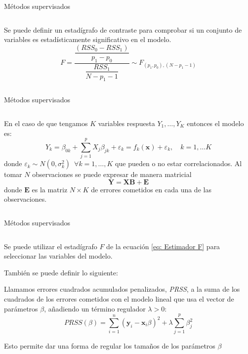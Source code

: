 \begin{frame}{Métodos supervisados}
\begin{columns}
\begin{column}{0.9\textwidth}
Se puede definir un estadígrafo de contraste para comprobar si un conjunto de variables es estadísticamente significativo en el modelo. 
\begin{equation}\label{eq: Estimador F}
F=\dfrac{\dfrac{(RSS_0-RSS_1)}{p_1-p_0}}{\dfrac{RSS_1}{N-p_1-1}}\sim F_{(p_1,p_0),(N-p_1-1)}
\end{equation}
\end{column}
\end{columns}
\end{frame}


\begin{frame}{Métodos supervisados}
\begin{columns}
\begin{column}{0.9\textwidth}
En el caso de que tengamos $K$ variables respuesta $Y_1,\ldots, Y_K$ entonces el modelo es:
\begin{equation}
Y_k=\beta_{0k}+\sum_{j=1}^p X_j\beta_{jk}+\varepsilon_k = f_k(\textbf{x})+\varepsilon_k, \quad k=1,\ldots K
\end{equation}
donde $\varepsilon_k \sim N(0,\sigma_k^2)\enspace\forall k=1,\ldots,K$ que pueden o no estar correlacionados. Al tomar $N$ observaciones se puede expresar de manera matricial
\begin{equation}
\mathbf{Y=XB+E}
\end{equation}
donde $\mathbf{E}$ es la matriz $N\times K$ de errores cometidos en cada una de las observaciones.
\end{column}
\end{columns}
\end{frame}


\begin{frame}{Métodos supervisados}
\begin{columns}
\begin{column}{0.9\textwidth}
Se puede utilizar el estadígrafo $F$ de la ecuación \ref{eq: Estimador F} para seleccionar las variables del modelo. 

También se puede definir lo siguiente: 
\begin{defi} 
Llamamos errores cuadrados acumulados penalizados, \emph{PRSS}, a la suma de los cuadrados de los errores cometidos con el modelo lineal que usa el  vector de parámetros $\beta$, añadiendo un término regulador $\lambda >0$: 
\begin{equation}
PRSS(\beta)=\sum_{i=1}^n(\textbf{y}_i-\textbf{x}_i\beta)^2+\lambda\sum_{j=1}^p\beta_j^2
\end{equation}
\end{defi}
Esto permite dar una forma de regular los tamaños de los parámetros $\beta$
\end{column}
\end{columns}
\end{frame}